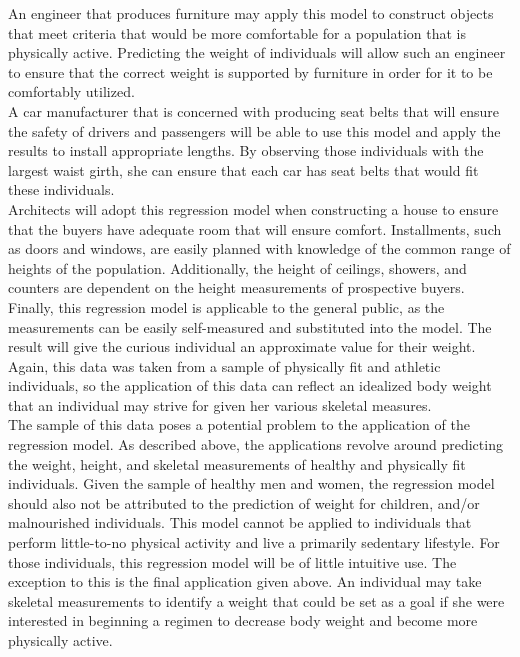 \documentclass[11pt]{article}\usepackage[]{graphicx}\usepackage[]{color}
\begin{document}
An engineer that produces furniture may apply this model to construct objects that meet criteria that would be more comfortable for a population that is physically active.  Predicting the weight of individuals will allow such an engineer to ensure that the correct weight is supported by furniture in order for it to be comfortably utilized.  \\

A car manufacturer that is concerned with producing seat belts that will ensure the safety of drivers and passengers will be able to use this model and apply the results to install appropriate lengths.  By observing those individuals with the largest waist girth, she can ensure that each car has seat belts that would fit these individuals.  \\

Architects will adopt this regression model when constructing a house to ensure that the buyers have adequate room that will ensure comfort.  Installments, such as doors and windows, are easily planned with knowledge of the common range of heights of the population.  Additionally, the height of ceilings, showers, and counters are dependent on the height measurements of prospective buyers.  
Finally, this regression model is applicable to the general public, as the measurements can be easily self-measured and substituted into the model.  The result will give the curious individual an approximate value for their weight.  Again, this data was taken from a sample of physically fit and athletic individuals, so the application of this data can reflect an idealized body weight that an individual may strive for given her various skeletal measures.  \\

The sample of this data poses a potential problem to the application of the regression model.  As described above, the applications revolve around predicting the weight, height, and skeletal measurements of healthy and physically fit individuals.  Given the sample of healthy men and women, the regression model should also not be attributed to the prediction of weight for children, and/or malnourished individuals.  This model cannot be applied to individuals that perform little-to-no physical activity and live a primarily sedentary lifestyle.  For those individuals, this regression model will be of little intuitive use.  The exception to this is the final application given above.  An individual may take skeletal measurements to identify a weight that could be set as a goal if she were interested in beginning a regimen to decrease body weight and become more physically active.\\
\end{document}
